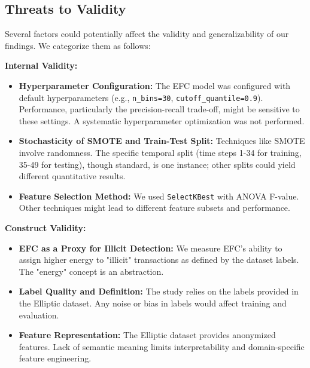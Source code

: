 \documentclass[12pt]{article}
\begin{document}
\subsection{Threats to Validity}\label{sec:threats}
Several factors could potentially affect the validity and generalizability of our findings. We categorize them as follows:

\textbf{Internal Validity:}
\begin{itemize}
    \item \textbf{Hyperparameter Configuration:} The EFC model was configured with default hyperparameters (e.g.,
    \texttt{n\_bins=30}, \texttt{cutoff\_quantile=0.9}). Performance, particularly the precision-recall trade-off, might
    be sensitive to these settings. A systematic hyperparameter optimization was not performed.
    \item \textbf{Stochasticity of SMOTE and Train-Test Split:} Techniques like SMOTE involve randomness. The specific
    temporal split (time steps 1-34 for training, 35-49 for testing), though standard, is one instance; other splits could
    yield different quantitative results.
    \item \textbf{Feature Selection Method:} We used \texttt{SelectKBest} with ANOVA F-value. Other techniques might lead
    to different feature subsets and performance.
\end{itemize}

\textbf{Construct Validity:}
\begin{itemize}
    \item \textbf{EFC as a Proxy for Illicit Detection:} We measure EFC's ability to assign higher energy to "illicit"
    transactions as defined by the dataset labels. The "energy" concept is an abstraction.
    \item \textbf{Label Quality and Definition:} The study relies on the labels provided in the Elliptic dataset. Any
    noise or bias in labels would affect training and evaluation.
    \item \textbf{Feature Representation:} The Elliptic dataset provides anonymized features. Lack of semantic meaning
    limits interpretability and domain-specific feature engineering.
\end{itemize}
\end{document}
